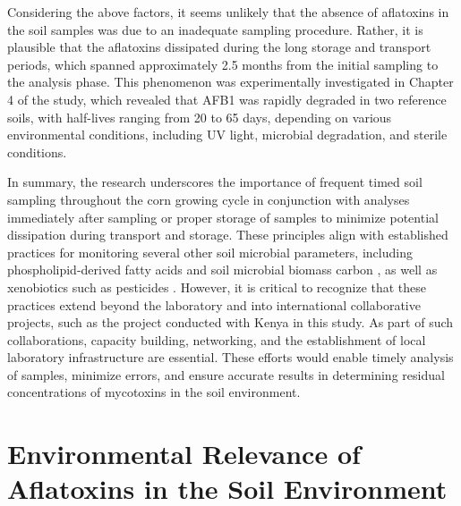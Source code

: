Considering the above factors, it seems unlikely that the absence of aflatoxins in the soil samples was due to an inadequate sampling procedure. Rather, it is plausible that the aflatoxins dissipated during the long storage and transport periods, which spanned approximately 2.5 months from the initial sampling to the analysis phase. This phenomenon was experimentally investigated in Chapter 4 of the study, which revealed that AFB1 was rapidly degraded in two reference soils, with half-lives ranging from 20 to 65 days, depending on various environmental conditions, including UV light, microbial degradation, and sterile conditions.


In summary, the research underscores the importance of frequent timed soil sampling throughout the corn growing cycle in conjunction with analyses immediately after sampling or proper storage of samples to minimize potential dissipation during transport and storage. These principles align with established practices for monitoring several other soil microbial parameters, including phospholipid-derived fatty acids \citep{petersen1994effects, veum2019phospholipid} and soil microbial biomass carbon \citep{vcernohlavkova2009variability, stenberg1998microbial}, as well as xenobiotics such as pesticides \citep{lehotay2015sampling}. However, it is critical to recognize that these practices extend beyond the laboratory and into international collaborative projects, such as the project conducted with Kenya in this study. As part of such collaborations, capacity building, networking, and the establishment of local laboratory infrastructure are essential. These efforts would enable timely analysis of samples, minimize errors, and ensure accurate results in determining residual concentrations of mycotoxins in the soil environment. 

\section{Environmental Relevance of Aflatoxins in the Soil Environment}


